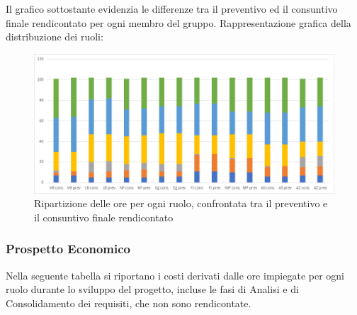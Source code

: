 Il grafico sottostante evidenzia le differenze tra il preventivo ed il consuntivo finale rendicontato per ogni membro del gruppo.
Rappresentazione grafica della distribuzione dei ruoli:
\begin{figure}[h]
  \centering
  \includegraphics[width=1\textwidth]{./res/img/membro_cons_vs_prev.png}
  \caption{Ripartizione delle ore per ogni ruolo, confrontata tra il preventivo e il
consuntivo finale rendicontato}
\end{figure}

\subsubsection{Prospetto Economico}
Nella seguente tabella si riportano i costi derivati dalle ore impiegate per ogni ruolo durante lo sviluppo del progetto, incluse le fasi di Analisi e di Consolidamento dei requisiti, che non sono rendicontate.

